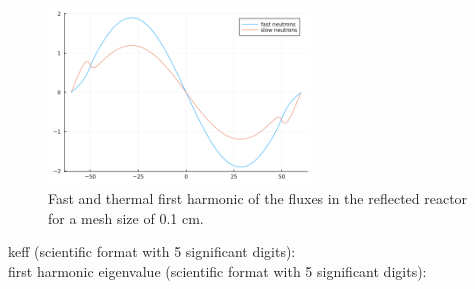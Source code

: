 \documentclass[11pt,a4paper]{article}
\begin{document}
\begin{figure}[h]
	\includegraphics[width=7cm]{../../figs/ex3/fist_harmonic_reflected.png}
	\centering
	\caption{Fast and thermal first harmonic of the fluxes in the reflected reactor for a mesh size of 0.1 cm.}
\end{figure}


keff (scientific format with 5 significant digits): \\

first harmonic eigenvalue (scientific format with 5 significant digits): \\



\end{document}
